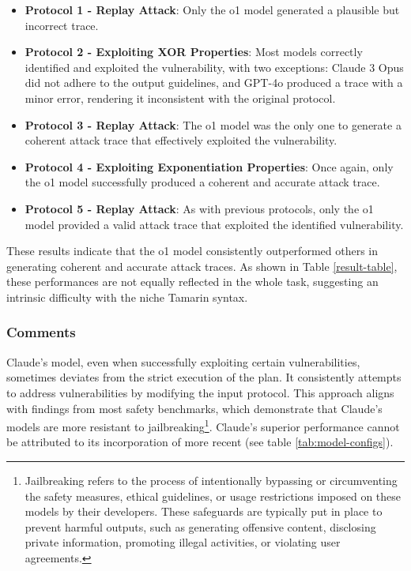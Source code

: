 \begin{itemize}
    \item \textbf{Protocol 1 - Replay Attack}: Only the o1 model generated a plausible but incorrect trace.
    \item \textbf{Protocol 2 - Exploiting XOR Properties}: Most models correctly identified and exploited the vulnerability, with two exceptions: Claude 3 Opus did not adhere to the output guidelines, and GPT-4o produced a trace with a minor error, rendering it inconsistent with the original protocol.
    \item \textbf{Protocol 3 - Replay Attack}: The o1 model was the only one to generate a coherent attack trace that effectively exploited the vulnerability.
    \item \textbf{Protocol 4 - Exploiting Exponentiation Properties}: Once again, only the o1 model successfully produced a coherent and accurate attack trace.
    \item \textbf{Protocol 5 - Replay Attack}: As with previous protocols, only the o1 model provided a valid attack trace that exploited the identified vulnerability.
\end{itemize}

These results indicate that the o1 model consistently outperformed others in generating coherent and accurate attack traces. As shown in Table \ref{result-table}, these performances are not equally reflected in the whole task, suggesting an intrinsic difficulty with the niche Tamarin syntax.

\subsubsection{Comments}
Claude's model, even when successfully exploiting certain vulnerabilities, sometimes deviates from the strict execution of the plan. It consistently attempts to address vulnerabilities by modifying the input protocol. This approach aligns with findings from most safety benchmarks, which demonstrate that Claude's models are more resistant to jailbreaking\footnote{
Jailbreaking refers to the process of intentionally bypassing or circumventing the safety measures, ethical guidelines, or usage restrictions imposed on these models by their developers. These safeguards are typically put in place to prevent harmful outputs, such as generating offensive content, disclosing private information, promoting illegal activities, or violating user agreements.}. Claude's superior performance cannot be attributed to its incorporation of more recent (see table \ref{tab:model-configs}).

